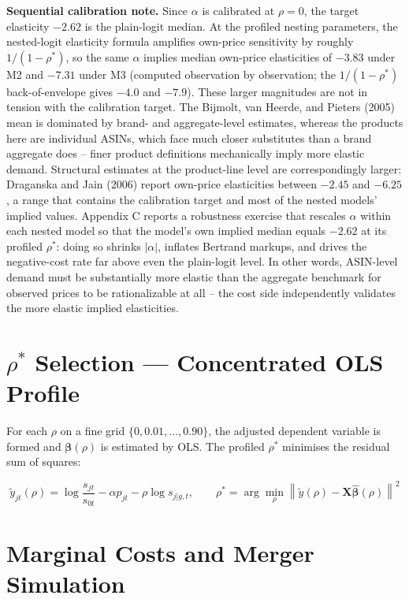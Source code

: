 \textbf{Sequential calibration note.} Since \(\alpha\) is calibrated at
\(\rho=0\), the target elasticity \(-2.62\) is the plain-logit median.
At the profiled nesting parameters, the nested-logit elasticity formula
amplifies own-price sensitivity by roughly \(1/(1-\rho^{*})\), so the
same \(\alpha\) implies median own-price elasticities of \(-3.83\) under
M2 and \(-7.31\) under M3 (computed observation by observation; the
\(1/(1-\rho^{*})\) back-of-envelope gives \(-4.0\) and \(-7.9\)). These
larger magnitudes are not in tension with the calibration target. The
Bijmolt, van Heerde, and Pieters (2005) mean is dominated by brand- and
aggregate-level estimates, whereas the products here are individual
ASINs, which face much closer substitutes than a brand aggregate does --
finer product definitions mechanically imply more elastic demand.
Structural estimates at the product-line level are correspondingly
larger: Draganska and Jain (2006) report own-price elasticities between
\(-2.45\) and \(-6.25\), a range that contains the calibration target
and most of the nested models' implied values. Appendix C reports a
robustness exercise that rescales \(\alpha\) within each nested model so
that the model's own implied median equals \(-2.62\) at its profiled
\(\rho^{*}\): doing so shrinks \(|\alpha|\), inflates Bertrand markups,
and drives the negative-cost rate far above even the plain-logit level.
In other words, ASIN-level demand must be substantially more elastic
than the aggregate benchmark for observed prices to be rationalizable at
all -- the cost side independently validates the more elastic implied
elasticities.

\section{\texorpdfstring{\(\rho^*\) Selection --- Concentrated OLS
Profile}{\textbackslash rho\^{}* Selection --- Concentrated OLS Profile}}\label{rho-selection-concentrated-ols-profile}

For each \(\rho\) on a fine grid \(\{0, 0.01, \ldots, 0.90\}\), the
adjusted dependent variable is formed and \(\boldsymbol{\beta}(\rho)\)
is estimated by OLS. The profiled \(\rho^*\) minimises the residual sum
of squares:

\[\tilde{y}_{jt}(\rho) = \log\frac{s_{jt}}{s_{0t}} - \alpha p_{jt} - \rho\log s_{j|g,t}, \qquad \rho^* = \arg\min_\rho \left\|\tilde{y}(\rho) - \mathbf{X}\hat{\boldsymbol{\beta}}(\rho)\right\|^2\]

\section{Marginal Costs and Merger
Simulation}\label{marginal-costs-and-merger-simulation}

